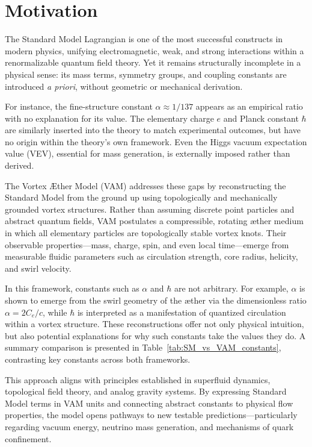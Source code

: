 \section{Motivation}

The Standard Model Lagrangian is one of the most successful constructs in modern physics, unifying electromagnetic, weak, and strong interactions within a renormalizable quantum field theory. Yet it remains structurally incomplete in a physical sense: its mass terms, symmetry groups, and coupling constants are introduced \textit{a priori}, without geometric or mechanical derivation.

For instance, the fine-structure constant $\alpha \approx 1/137$ appears as an empirical ratio with no explanation for its value. The elementary charge $e$ and Planck constant $\hbar$ are similarly inserted into the theory to match experimental outcomes, but have no origin within the theory's own framework. Even the Higgs vacuum expectation value (VEV), essential for mass generation, is externally imposed rather than derived.

The Vortex Æther Model (VAM) addresses these gaps by reconstructing the Standard Model from the ground up using topologically and mechanically grounded vortex structures. Rather than assuming discrete point particles and abstract quantum fields, VAM postulates a compressible, rotating æther medium in which all elementary particles are topologically stable vortex knots. Their observable properties—mass, charge, spin, and even local time—emerge from measurable fluidic parameters such as circulation strength, core radius, helicity, and swirl velocity.

In this framework, constants such as $\alpha$ and $\hbar$ are not arbitrary. For example, $\alpha$ is shown to emerge from the swirl geometry of the æther via the dimensionless ratio $\alpha = 2C_e / c$, while $\hbar$ is interpreted as a manifestation of quantized circulation within a vortex structure. These reconstructions offer not only physical intuition, but also potential explanations for why such constants take the values they do. A summary comparison is presented in Table~\ref{tab:SM_vs_VAM_constants}, contrasting key constants across both frameworks.

This approach aligns with principles established in superfluid dynamics, topological field theory, and analog gravity systems. By expressing Standard Model terms in VAM units and connecting abstract constants to physical flow properties, the model opens pathways to new testable predictions—particularly regarding vacuum energy, neutrino mass generation, and mechanisms of quark confinement.



